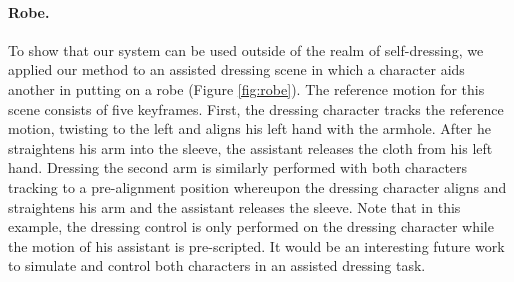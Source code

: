 \paragraph{Robe.} To show that our system can be used outside of the realm of self-dressing, we applied our method to an assisted dressing scene in which a character aids another in putting on a robe (Figure \ref{fig:robe}). The reference motion for this scene consists of five keyframes. First, the dressing character tracks the reference motion, twisting to the left and aligns his left hand with the armhole. After he straightens his arm into the sleeve, the assistant releases the cloth from his left hand. Dressing the second arm is similarly performed with both characters tracking to a pre-alignment position whereupon the dressing character aligns and straightens his arm and the assistant releases the sleeve. Note that in this example, the dressing control is only performed on the dressing character while the motion of his assistant is pre-scripted. It would be an interesting future work to simulate and control both characters in an assisted dressing task.
